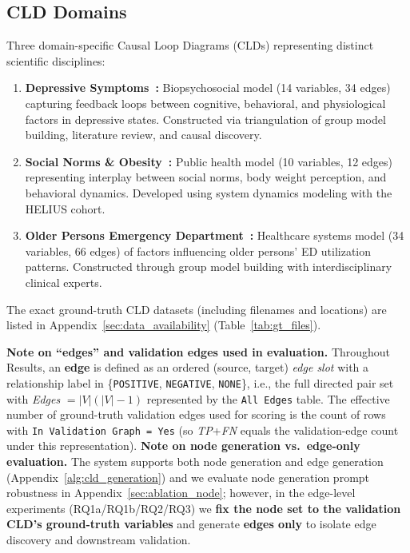 \subsection{CLD Domains}
Three domain-specific Causal Loop Diagrams (CLDs) representing distinct scientific disciplines:
\begin{enumerate}[noitemsep]
    \item \textbf{Depressive Symptoms~\cite{uleman2024triangulation}:} Biopsychosocial model (14 variables, 34 edges) capturing feedback loops between cognitive, behavioral, and physiological factors in depressive states. Constructed via triangulation of group model building, literature review, and causal discovery.
    \item \textbf{Social Norms \& Obesity~\cite{crielaard2020socialnorms}:} Public health model (10 variables, 12 edges) representing interplay between social norms, body weight perception, and behavioral dynamics. Developed using system dynamics modeling with the HELIUS cohort.
    \item \textbf{Older Persons Emergency Department~\cite{smeekes2023emergency}:} Healthcare systems model (34 variables, 66 edges) of factors influencing older persons' ED utilization patterns. Constructed through group model building with interdisciplinary clinical experts.
\end{enumerate}
The exact ground-truth CLD datasets (including filenames and locations) are listed in Appendix~\ref{sec:data_availability} (Table~\ref{tab:gt_files}).

\textbf{Note on ``edges'' and validation edges used in evaluation.} Throughout Results, an \textbf{edge} is defined as an ordered (source, target) \textit{edge slot} with a relationship label in \{\texttt{POSITIVE}, \texttt{NEGATIVE}, \texttt{NONE}\}, i.e., the full directed pair set with \textit{Edges} $=|V|(|V|-1)$ represented by the \texttt{All Edges} table. The effective number of ground-truth validation edges used for scoring is the count of rows with \texttt{In Validation Graph = Yes} (so \textit{TP}+\textit{FN} equals the validation-edge count under this representation).
\textbf{Note on node generation vs.\ edge-only evaluation.} The system supports both node generation and edge generation (Appendix~\ref{alg:cld_generation}) and we evaluate node generation prompt robustness in Appendix~\ref{sec:ablation_node}; however, in the edge-level experiments (RQ1a/RQ1b/RQ2/RQ3) we \textbf{fix the node set to the validation CLD's ground-truth variables} and generate \textbf{edges only} to isolate edge discovery and downstream validation.

